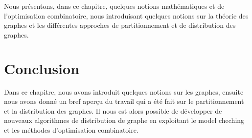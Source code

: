 Nous présentons, dans ce chapitre, quelques notions mathématiques et de l'optimisation combinatoire, nous introduisant quelques notions sur la théorie des graphes et les différentes approches de partitionnement et de distribution des graphes. 







\section{Conclusion}{
Dans ce chapitre, nous avons introduit quelques notions sur les graphes, ensuite nous avons donné un bref aperçu du travail qui a été fait sur le partitionnement et la distribution des graphes. Il nous est alors possible de développer de nouveaux algorithmes de distribution de graphe en exploitant le model cheching et les méthodes  d'optimisation combinatoire.
}